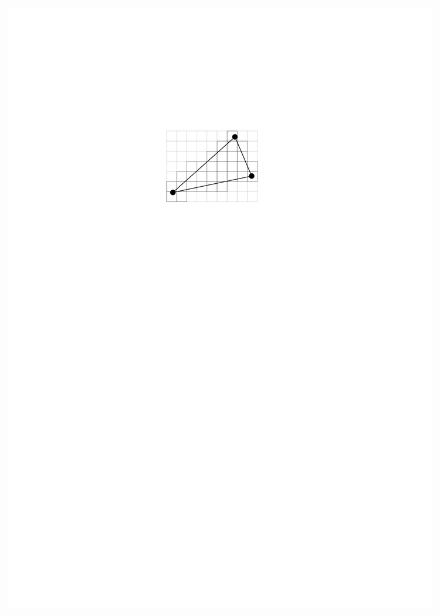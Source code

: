 \documentclass[twoside,a4paper,fleqn,12pt]{book}
\begin{document}
\begin{figure}[h]
  \includegraphics[scale=0.8]{triraster2}
  \qquad

\end{figure}
\end{document}
